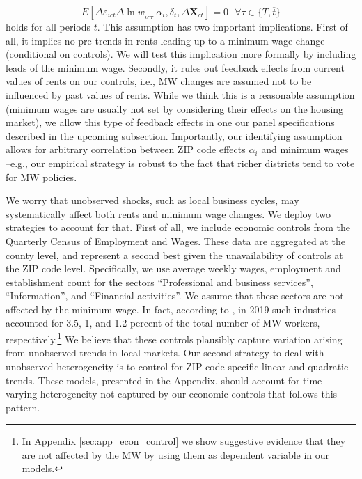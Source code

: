 \begin{equation*}
	E[\Delta \varepsilon_{ict} \Delta \ln \underline{w}_{ic\tau}  
							| \alpha_i, \delta_t, \Delta \mathbf{X}_{ct}] = 0
	\ \ \ \forall \tau \in \{\underline{T}, \overline{t} \}
\end{equation*}
holds for all periods $t$. This assumption has two important implications. First of all, 
it implies no pre-trends in rents leading up to a minimum wage change (conditional on 
controls). We will test this implication more formally by including leads of the minimum 
wage. Secondly, it rules out feedback effects from current values of rents on our controls, 
i.e., MW changes are assumed not to be influenced by past values of rents. While we think 
this is a reasonable assumption (minimum wages are usually not set by considering their 
effects on the housing market), we allow this type of feedback effects in one our panel 
specifications described in the upcoming subsection. Importantly, our identifying assumption 
allows for arbitrary correlation between ZIP code effects $\alpha_i$ and minimum wages 
--e.g., our empirical strategy is robust to the fact that richer districts tend to vote 
for MW policies.


We worry that unobserved shocks, such as local business cycles, may systematically affect 
both rents and minimum wage changes. We deploy two strategies to account for that. First 
of all, we include economic controls from the Quarterly Census of Employment and Wages. 
These data are aggregated at the county level, and represent a second best given the 
unavailability of controls at the ZIP code level. Specifically, we use average weekly wages, 
employment and establishment count for the sectors ``Professional and business services'', 
``Information'', and ``Financial activities''. We assume that these sectors are not affected 
by the minimum wage. In fact, according to \textcite[][table 5]{MinWorkersReportBLS}, in 2019 
such industries accounted for 3.5, 1, and 1.2 percent of the total number of MW workers, 
respectively.\footnote{In Appendix \ref{sec:app_econ_control} we show suggestive evidence 
	that they are not affected by the MW by using them as dependent variable in our models.}
We believe that these controls plausibly capture variation arising from unobserved trends 
in local markets. Our second strategy to deal with unobserved heterogeneity is to control for
ZIP code-specific linear and quadratic trends. These models, presented in the Appendix, 
should account for time-varying heterogeneity not captured by our economic controls that 
follows this pattern.

